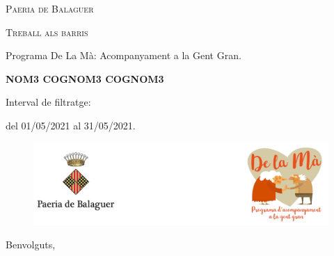 \documentclass[a4paper,12pt]{elsarticle}  %
\begin{document}
 	


\begin{titlepage}
	\centering

	{\scshape\LARGE Paeria de Balaguer \par}


			\vfill


	{\scshape\Large Treball als barris\par}

	
			\vspace{0.5cm}

	
	{\Large Programa De La Mà: Acompanyament a la Gent Gran.\par}

			

			\vfill



	{\Large\bfseries NOM3 COGNOM3 COGNOM3 \par}
	


			\vfill



	{\large Interval de filtratge:\par}
	{\large del 01/05/2021 al 31/05/2021.\par}
		

\end{titlepage}



\clearpage







\FloatBarrier
\begin{figure}[h]
	\centering	
	\includegraphics[width=1\textwidth]{../IMATGES/logoPaeriaMa.png}
\end{figure}
\FloatBarrier	

\vfill









\noindent Benvolguts,

	\vspace{0.5cm}
\end{document}
